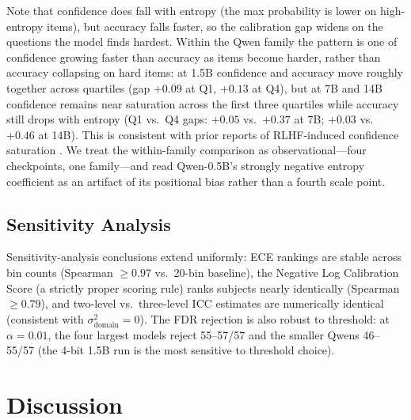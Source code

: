 \documentclass[11pt]{article}
\begin{document}
Note that confidence does fall with entropy (the max probability is lower on
high-entropy items), but accuracy falls faster, so the calibration gap widens
on the questions the model finds hardest.
Within the Qwen family the pattern is one of confidence growing faster than
accuracy as items become harder, rather than accuracy collapsing on hard
items: at 1.5B confidence and accuracy move roughly together across quartiles
(gap $+0.09$ at Q1, $+0.13$ at Q4), but at 7B and 14B confidence remains near
saturation across the first three quartiles while accuracy still drops with
entropy (Q1 vs.\ Q4 gaps: $+0.05$ vs.\ $+0.37$ at 7B; $+0.03$ vs.\ $+0.46$
at 14B). This is consistent with prior reports of RLHF-induced confidence
saturation \citep{kadavath2022language, nakkiran2025trained, yaldiz2026balancing}.
We treat the within-family comparison as observational---four checkpoints, one
family---and read Qwen-0.5B's strongly negative entropy coefficient as an
artifact of its positional bias rather than a fourth scale point.

\subsection{Sensitivity Analysis}
\label{sec:sensitivity}

Sensitivity-analysis conclusions extend uniformly: ECE rankings are stable
across bin counts (Spearman $\geq 0.97$ vs.\ 20-bin baseline), the
Negative Log Calibration Score (a strictly proper scoring rule) ranks
subjects nearly identically (Spearman $\geq 0.79$), and two-level vs.\
three-level ICC estimates are numerically identical (consistent with
$\sigma^2_{\text{domain}}=0$). The FDR rejection is also robust to threshold:
at $\alpha = 0.01$, the four largest models reject 55--57/57 and the smaller
Qwens 46--55/57 (the 4-bit 1.5B run is the most sensitive to threshold choice).

\section{Discussion}
\end{document}
